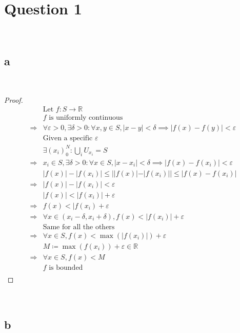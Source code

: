 \documentclass{article}
\begin{document}
\section*{Question 1}

~

\subsection*{a}

~

\begin{proof}
    \begin{align*}
        &\text{Let }f:S\to\mathbb{R}\\
        &f\text{ is uniformly continuous}\\
        \Rightarrow&\forall \varepsilon>0,\exists\delta>0:\forall x,y\in S,|x-y|<\delta\implies |f(x)-f(y)|<\varepsilon\\
        &\text{Given a specific }\varepsilon\\
        &\exists (x_i)_0^N:\bigcup_{i}U_{x_i}=S\\
        \Rightarrow&x_i\in S,\exists \delta>0:\forall x\in S,|x-x_i|<\delta\implies |f(x)-f(x_i)|<\varepsilon\\
        &|f(x)|-|f(x_i)|\leqslant||f(x)|-|f(x_i)||\leqslant|f(x)-f(x_i)|\\
        \Rightarrow&|f(x)|-|f(x_i)|<\varepsilon\\
        &|f(x)|<|f(x_i)|+\varepsilon\\
        \Rightarrow&f(x)<|f(x_i)+\varepsilon\\
        \Rightarrow&\forall x\in(x_i-\delta,x_i+\delta),f(x)<|f(x_i)|+\varepsilon\\
        &\text{Same for all the others}\\
        \Rightarrow&\forall x\in S, f(x)<\max(|f(x_i)|)+\varepsilon\\
        &M\coloneqq\max(f(x_i))+\varepsilon\in\mathbb{R}\\
        \Rightarrow&\forall x\in S, f(x)<M\\
        &f\text{ is bounded}\\
    \end{align*}
\end{proof}

~

\subsection*{b}
\end{document}

